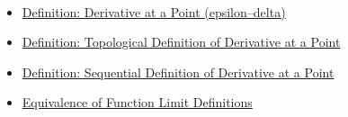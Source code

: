 \begin{remark*}[Dependencies]~\\
\begin{itemize}
  \item \hyperref[def:derivative-at-a-point]{Definition: Derivative at a Point (epsilon--delta)}
  \item \hyperref[def:topological-definition-of-derivative-at-a-point]{Definition: Topological Definition of Derivative at a Point}
  \item \hyperref[def:sequential-definition-of-derivative-at-a-point]{Definition: Sequential Definition of Derivative at a Point}
  \item \hyperref[thm:equivalence-of-function-limit-definitions]{Equivalence of Function Limit Definitions}
\end{itemize}
\end{remark*}

